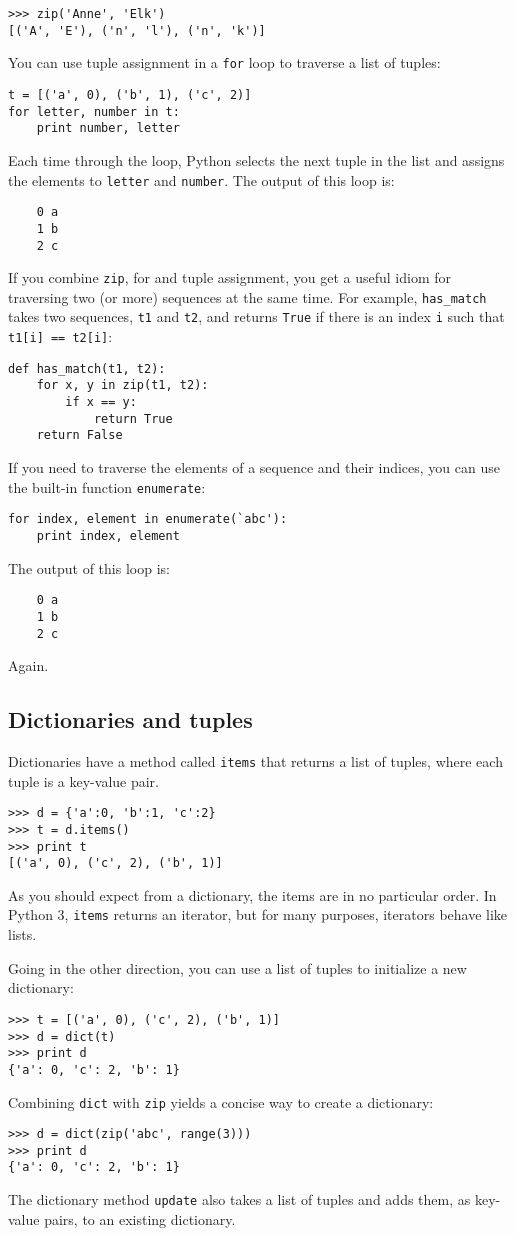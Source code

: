 \documentclass{article}
\begin{document}
\begin{verbatim}
>>> zip('Anne', 'Elk')
[('A', 'E'), ('n', 'l'), ('n', 'k')]
\end{verbatim}
You can use tuple assignment in a \verb|for| loop to traverse a list of
tuples:
\begin{verbatim}
t = [('a', 0), ('b', 1), ('c', 2)]
for letter, number in t:
    print number, letter
\end{verbatim}
Each time through the loop, Python selects the next tuple in the
list and assigns the elements to \verb|letter| and \verb|number|.
The output of this loop is:
\begin{verbatim}
    0 a
    1 b
    2 c
\end{verbatim}
If you combine \verb|zip|, for and tuple assignment, you get a useful
idiom for traversing two (or more) sequences at the same time. For
example, \verb|has_match| takes two sequences, \verb|t1| and \verb|t2|,
and returns \verb|True| if there is an index \verb|i| such that
\verb|t1[i] == t2[i]|:
\begin{verbatim}
def has_match(t1, t2):
    for x, y in zip(t1, t2):
        if x == y:
            return True
    return False
\end{verbatim}
If you need to traverse the elements of a sequence and their indices, you
can use the built-in function \verb|enumerate|:
\begin{verbatim}
for index, element in enumerate(`abc'):
    print index, element
\end{verbatim}
The output of this loop is:
\begin{verbatim}
    0 a
    1 b
    2 c
\end{verbatim}
Again.

\subsection{Dictionaries and tuples}
Dictionaries have a method called \verb|items| that returns a list of tuples,
where each tuple is a key-value pair.
\begin{verbatim}
>>> d = {'a':0, 'b':1, 'c':2}
>>> t = d.items()
>>> print t
[('a', 0), ('c', 2), ('b', 1)]
\end{verbatim}
As you should expect from a dictionary, the items are in no particular
order. In Python 3, \verb|items| returns an iterator, but for many purposes,
iterators behave like lists.

Going in the other direction, you can use a list of tuples to
initialize a new dictionary:
\begin{verbatim}
>>> t = [('a', 0), ('c', 2), ('b', 1)]
>>> d = dict(t)
>>> print d
{'a': 0, 'c': 2, 'b': 1}
\end{verbatim}
Combining \verb|dict| with \verb|zip| yields a concise way to create a
dictionary:
\begin{verbatim}
>>> d = dict(zip('abc', range(3)))
>>> print d
{'a': 0, 'c': 2, 'b': 1}
\end{verbatim}
The dictionary method \verb|update| also takes a list of tuples and adds
them, as key-value pairs, to an existing dictionary.
\end{document}
